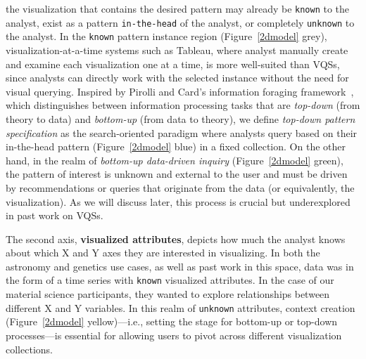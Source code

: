 the visualization that contains
the desired pattern may already be \texttt{known} to the analyst,
exist as a pattern \texttt{in-the-head} of the analyst,
or completely \texttt{unknown} to the analyst.
In the \texttt{known} pattern instance region (Figure~\ref{2dmodel} grey), visualization-at-a-time systems such as Tableau,
where analyst manually create and examine each visualization one at a time,
is more well-suited than VQSs, since analysts can directly work with the selected instance without the need for visual querying.
Inspired by Pirolli and Card's information
foraging framework~\cite{Pirolli}, which distinguishes
between information processing tasks that are \textit{top-down}
(from theory to data) and \textit{bottom-up} (from data to theory),
we define \textit{top-down pattern specification} as the search-oriented paradigm where analysts query based on their
in-the-head pattern (Figure~\ref{2dmodel} blue) in a fixed collection.
On the other hand, in the realm of \textit{bottom-up
data-driven inquiry} (Figure~\ref{2dmodel} green),
the pattern of interest is unknown and external
to the user and must be driven by recommendations
or queries that originate from the data (or equivalently, the visualization).
As we will discuss later, this process is crucial
but underexplored in past work on VQSs.
\par The second axis, \textbf{visualized attributes},
depicts how much the analyst
knows about which X and Y axes
they are interested in visualizing.
In both the astronomy and genetics use cases,
as well as past work in this space,
data was in the form of a time series
with \texttt{known} visualized attributes.
In the case of our material science participants,
they wanted to explore relationships between different
X and Y variables.
In this realm of \texttt{unknown} attributes,
context creation (Figure~\ref{2dmodel} yellow)---i.e.,
setting the stage for bottom-up or top-down processes---is
essential for allowing users
to pivot across different visualization collections.%
